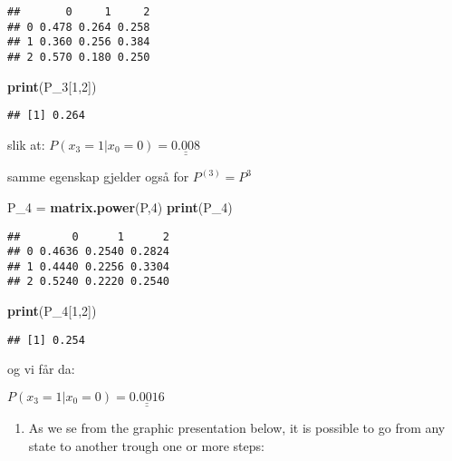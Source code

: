 \documentclass[]{article}
\newenvironment{Shaded}{\begin{snugshade}}{\end{snugshade}}
\newcommand{\DecValTok}[1]{\textcolor[rgb]{0.00,0.00,0.81}{#1}}
\newcommand{\KeywordTok}[1]{\textcolor[rgb]{0.13,0.29,0.53}{\textbf{#1}}}
\newcommand{\NormalTok}[1]{#1}
\newcommand{\StringTok}[1]{\textcolor[rgb]{0.31,0.60,0.02}{#1}}
\providecommand{\tightlist}{%
  \setlength{\itemsep}{0pt}\setlength{\parskip}{0pt}}
\begin{document}
\begin{verbatim}
##       0     1     2
## 0 0.478 0.264 0.258
## 1 0.360 0.256 0.384
## 2 0.570 0.180 0.250
\end{verbatim}

\begin{Shaded}
\begin{Highlighting}[]
\KeywordTok{print}\NormalTok{(P_}\DecValTok{3}\NormalTok{[}\DecValTok{1}\NormalTok{,}\DecValTok{2}\NormalTok{])}
\end{Highlighting}
\end{Shaded}

\begin{verbatim}
## [1] 0.264
\end{verbatim}

slik at: \(P(x_{3}=1|x_{0}=0) = \underline{\underline{0.008}}\)

samme egenskap gjelder også for \(P^{(3)}=P^{3}\)

\begin{Shaded}
\begin{Highlighting}[]
\NormalTok{P_}\DecValTok{4}\NormalTok{ =}\StringTok{ }\KeywordTok{matrix.power}\NormalTok{(P,}\DecValTok{4}\NormalTok{)}
\KeywordTok{print}\NormalTok{(P_}\DecValTok{4}\NormalTok{)}
\end{Highlighting}
\end{Shaded}

\begin{verbatim}
##        0      1      2
## 0 0.4636 0.2540 0.2824
## 1 0.4440 0.2256 0.3304
## 2 0.5240 0.2220 0.2540
\end{verbatim}

\begin{Shaded}
\begin{Highlighting}[]
\KeywordTok{print}\NormalTok{(P_}\DecValTok{4}\NormalTok{[}\DecValTok{1}\NormalTok{,}\DecValTok{2}\NormalTok{])}
\end{Highlighting}
\end{Shaded}

\begin{verbatim}
## [1] 0.254
\end{verbatim}

og vi får da:

\(P(x_{3}=1|x_{0}=0) = \underline{\underline{0.0016}}\)

\begin{enumerate}
\def\labelenumi{\alph{enumi})}
\setcounter{enumi}{1}
\tightlist
\item
  As we se from the graphic presentation below, it is possible to go
  from any state to another trough one or more steps:
\end{enumerate}
\end{document}
